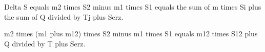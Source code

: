 Delta S equals m2 times S2 minus m1 times S1 equals the sum of m times Si plus the sum of Q divided by Tj plus Serz.  

m2 times (m1 plus m12) times S2 minus m1 times S1 equals m12 times S12 plus Q divided by T plus Serz.